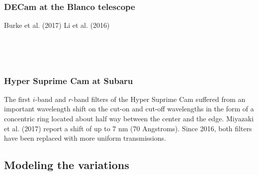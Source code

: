 \documentclass{article}
\begin{document}
    \begin{center}
    \end{center}
    { \hspace*{\fill} \\}
    
    \hypertarget{decam-at-the-blanco-telescope}{%
\subsubsection{DECam at the Blanco
telescope}\label{decam-at-the-blanco-telescope}}

Burke et al. (2017) Li et al. (2016)


    \begin{center}
    \end{center}
    { \hspace*{\fill} \\}
    
    \begin{center}
    \end{center}
    { \hspace*{\fill} \\}
    
    \hypertarget{hyper-suprime-cam-at-subaru}{%
\subsubsection{Hyper Suprime Cam at
Subaru}\label{hyper-suprime-cam-at-subaru}}

The first \(i\)-band and \(r\)-band filters of the Hyper Suprime Cam
suffered from an important wavelength shift on the cut-on and cut-off
wavelengths in the form of a concentric ring located about half way
between the center and the edge. Miyazaki et al. (2017) report a shift
of up to 7 nm (70 Angstroms). Since 2016, both filters have been
replaced with more uniform transmissions.

\hypertarget{modeling-the-variations}{%
\subsection{Modeling the variations}\label{modeling-the-variations}}
\end{document}
